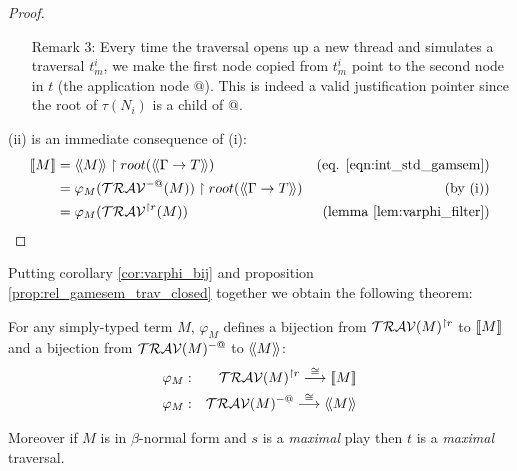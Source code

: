 \begin{proof}
\begin{itemize}
\begin{itemize}
    \item[Remark 3:]Every time the traversal opens up a new thread and simulates a
    traversal $t^i_{m}$, we make the first node copied from $t^i_{m}$ point to the
    second node in $t$ (the application node $@$). This is indeed a valid justification pointer since the root of $\tau(N_i)$ is a child of $@$.
    \end{itemize}
\end{itemize}

(ii) is an immediate consequence of (i):
\begin{align*}
\sem{M} &= \intersem{M} \upharpoonright root(\intersem{\Gamma \rightarrow T}) & \mbox{(eq. \ref{eqn:int_std_gamsem})} \\
        &= \varphi_M(\travset^{-@}(M)) \upharpoonright root(\intersem{\Gamma \rightarrow T}) & \mbox{(by (i))}\\
        &= \varphi_M(\travset^{\upharpoonright r}(M)) & \mbox{(lemma \ref{lem:varphi_filter})}\\
\end{align*}
\end{proof}

%




Putting corollary \ref{cor:varphi_bij} and proposition
\ref{prop:rel_gamesem_trav_closed} together we obtain the following
theorem:

\begin{thm}
For any simply-typed term $M$, $\varphi_M$ defines a bijection from
$\mathcal{TRAV}(M)^{\upharpoonright r}$ to ${[\![ M ]\!]}$ and a bijection
from $\mathcal{TRAV}(M)^{-@}$ to ${\langle\!\langle M \rangle\!\rangle}$:
\begin{eqnarray*}
 \varphi_M  &:& \mathcal{TRAV}(M)^{\upharpoonright r} \stackrel{\cong}{\longrightarrow} {[\![ M ]\!]} \\
 \varphi_M  &:& \mathcal{TRAV}(M)^{-@} \stackrel{\cong}{\longrightarrow} {\langle\!\langle M \rangle\!\rangle}
\end{eqnarray*}

Moreover if $M$ is in $\beta$-normal form and $s$ is a
\emph{maximal} play then  $t$ is a \emph{maximal} traversal.
\end{thm}

